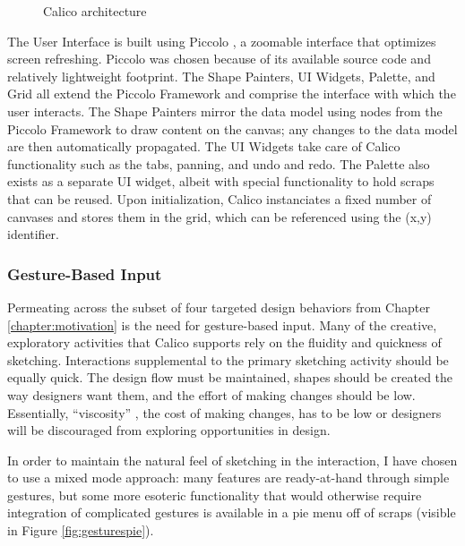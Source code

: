 \documentclass[12pt,fleqn]{ucithesis}
\begin{document}
\begin{figure}
  \centering

\caption {Calico architecture}
\label{fig:arch}       %
\end{figure}
%

The User Interface is built using Piccolo \citep{Bederson}, a zoomable interface that optimizes screen refreshing. Piccolo was chosen because of its available source code and relatively lightweight footprint. The Shape Painters, UI Widgets, Palette, and Grid all extend the Piccolo Framework and comprise the interface with which the user interacts. The Shape Painters mirror the data model using nodes from the Piccolo Framework to draw content on the canvas; any changes to the data model are then automatically propagated. The UI Widgets take care of Calico functionality such as the tabs, panning, and undo and redo. The Palette also exists as a separate UI widget, albeit with special functionality to hold scraps that can be reused. Upon initialization, Calico instanciates a fixed number of canvases and stores them in the grid, which can be referenced using the (x,y) identifier. 

\subsubsection {Gesture-Based Input}
\label{calico:5}

Permeating across the subset of four targeted design behaviors from Chapter \ref{chapter:motivation} is the need for gesture-based input. Many of the creative, exploratory activities that Calico supports rely on the fluidity and quickness of sketching. Interactions supplemental to the primary sketching activity should be equally quick. The design flow must be maintained, shapes should be created the way designers want them, and the effort of making changes should be low. Essentially, ``viscosity'' \citep{petre2009insights}, the cost of making changes, has to be low or designers will be discouraged from exploring opportunities in design. 

In order to maintain the natural feel of sketching in the interaction, I have chosen to use a mixed mode approach: many features are ready-at-hand through simple gestures, but some more esoteric functionality that would otherwise require integration of complicated gestures is available in a pie menu off of scraps (visible in Figure \ref{fig:gesturespie}).
\end{document}
